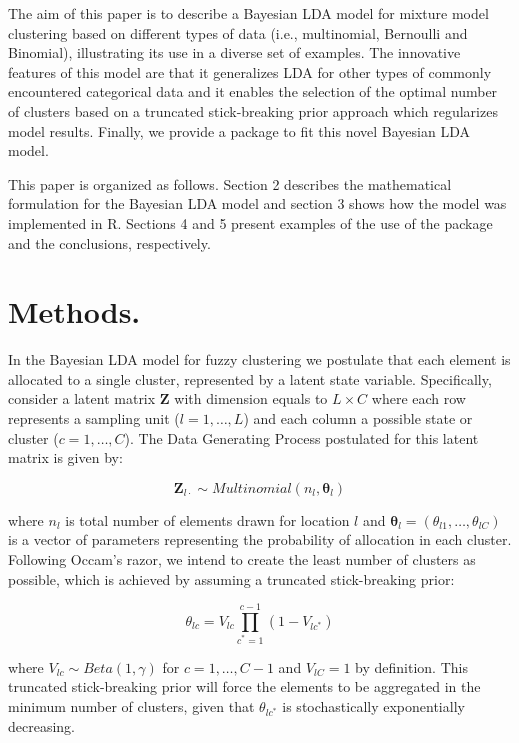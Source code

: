 \documentclass[article]{jss}
\begin{document}
The aim of this paper is to describe a Bayesian LDA model for mixture
model clustering based on different types of data (i.e., multinomial,
Bernoulli and Binomial), illustrating its use in a diverse set of
examples. The innovative features of this model are that it generalizes
LDA for other types of commonly encountered categorical data and it
enables the selection of the optimal number of clusters based on a
truncated stick-breaking prior approach which regularizes model results.
Finally, we provide a package to fit this novel Bayesian LDA model.

This paper is organized as follows. Section 2 describes the mathematical
formulation for the Bayesian LDA model and section 3 shows how the model
was implemented in R. Sections 4 and 5 present examples of the use of
the package and the conclusions, respectively.

\section{Methods.}\label{methods.}

In the Bayesian LDA model for fuzzy clustering we postulate that each
element is allocated to a single cluster, represented by a latent state
variable. Specifically, consider a latent matrix \(\mathbf{Z}\) with
dimension equals to \(L\times C\) where each row represents a sampling
unit (\(l=1,\dots,L\)) and each column a possible state or cluster
(\(c=1,\dots,C\)). The Data Generating Process postulated for this
latent matrix is given by:

\begin{equation}
\boldsymbol Z_{l\cdot}\sim Multinomial(n_{l},\boldsymbol\theta_{l})
\label{eq:eq0001}
\end{equation}

\noindent where \(n_{l}\) is total number of elements drawn for location
\(l\) and \(\boldsymbol\theta_{l}=(\theta_{l1},\dots,\theta_{lC})\) is a
vector of parameters representing the probability of allocation in each
cluster. Following Occam's razor, we intend to create the least number
of clusters as possible, which is achieved by assuming a truncated
stick-breaking prior:

\begin{equation}
\theta_{lc}=V_{lc}\displaystyle\prod_{c^{*}=1}^{c-1}(1-V_{lc^{*}})
\label{eq:eq0002}
\end{equation}

\noindent where \(V_{lc}\sim Beta(1,\gamma)\) for \(c=1,\dots,C-1\) and
\(V_{lC}=1\) by definition. This truncated stick-breaking prior will
force the elements to be aggregated in the minimum number of clusters,
given that \(\theta_{lc^{*}}\) is stochastically exponentially
decreasing.
\end{document}
